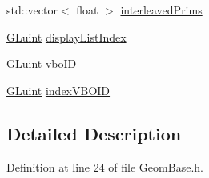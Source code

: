 \begin{DoxyCompactItemize}
\item 
std\-::vector$<$ float $>$ \hyperlink{class_geom_base_a0800fd85697c8b330d0635a2c80f1c8d}{interleaved\-Prims}
\item 
\hyperlink{gl_8h_a68c4714e43d8e827d80759f9cb864f3c}{G\-Luint} \hyperlink{class_geom_base_ade5e0a77c4a4488cb449406fdaa14524}{display\-List\-Index}
\item 
\hyperlink{gl_8h_a68c4714e43d8e827d80759f9cb864f3c}{G\-Luint} \hyperlink{class_geom_base_a9fd2238f1b31b148d70f22a98c6d30b5}{vbo\-I\-D}
\item 
\hyperlink{gl_8h_a68c4714e43d8e827d80759f9cb864f3c}{G\-Luint} \hyperlink{class_geom_base_ac9801ee653f63ed5d544a237cc485183}{index\-V\-B\-O\-I\-D}
\end{DoxyCompactItemize}


\subsection{Detailed Description}


Definition at line 24 of file Geom\-Base.\-h.



